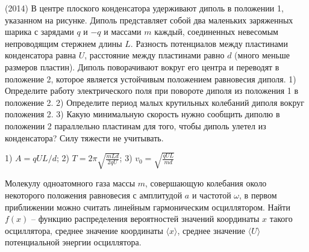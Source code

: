 \begin{ex}
(2014) В центре плоского конденсатора удерживают диполь в положении 1, указанном на рисунке. 
Диполь представляет собой два маленьких заряженных шарика с зарядами $q$ и $-q$ и массами $m$ каждый, 
соединенных невесомым непроводящим стержнем длины $L$. Разность потенциалов между пластинами конденсатора равна $U$, 
расстояние между пластинами равно $d$ (много меньше размеров пластин). Диполь поворачивают вокруг его центра и переводят в положение 2, 
которое является устойчивым положением равновесия диполя. 
1) Определите работу электрического поля при повороте диполя из положения 1 в положение 2. 
2) Определите период малых крутильных колебаний диполя вокруг положения 2. 
3) Какую минимальную скорость нужно сообщить диполю в положении 2 параллельно пластинам для того, чтобы диполь улетел из конденсатора? 
Силу тяжести не учитывать.
\begin{center}

\end{center}
\begin{ans}
1) $A=qUL/d$; 2) $T=2\pi\sqrt{\frac{mLd}{2qU}}$; 3) $v_0 = \sqrt{\frac{qUL}{md }}$
\end{ans}
\end{ex}

\begin{ex}
Молекулу одноатомного газа массы $m$, совершающую колебания около некоторого положения равновесия с амплитудой $a$ и частотой $\omega$, 
в первом приближении можно считать линейным гармоническим осциллятором. 
Найти $f(x)$ -- функцию распределения вероятностей значений координаты $x$ такого осциллятора, среднее значение координаты $\langle x \rangle$, 
среднее значение $\langle U \rangle$ потенциальной энергии осциллятора.
\begin{ans}
\end{ans}
\end{ex}